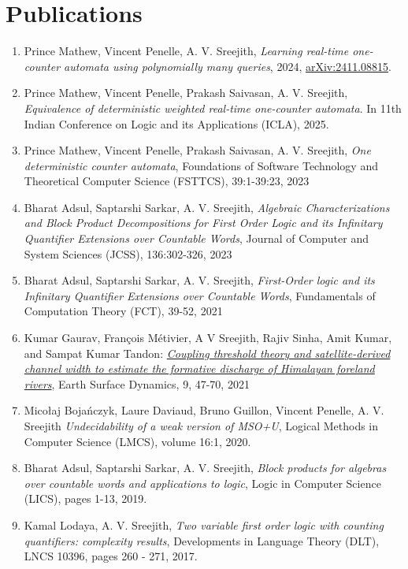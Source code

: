 \documentclass[11pt,a4paper,sans]{moderncv} %
\begin{document}
\section{Publications}
\begin{enumerate}
\item Prince Mathew, Vincent Penelle, A. V. Sreejith, \emph{Learning real-time one-counter automata using polynomially many queries}, 2024, \href{https://arxiv.org/abs/2411.08815}{arXiv:2411.08815}.
\item Prince Mathew, Vincent Penelle, Prakash Saivasan, A. V. Sreejith, \emph{Equivalence of deterministic weighted real-time one-counter automata}. In 11th Indian Conference on Logic and its Applications (ICLA), 2025.
\item Prince Mathew, Vincent Penelle, Prakash Saivasan, A. V. Sreejith, \emph{One deterministic counter automata}, Foundations of Software Technology and Theoretical Computer Science (FSTTCS), 39:1-39:23, 2023
\item Bharat Adsul, Saptarshi Sarkar, A. V. Sreejith, \emph{Algebraic Characterizations and Block Product Decompositions for First Order Logic and its Infinitary Quantifier Extensions over Countable Words}, Journal of Computer and System Sciences (JCSS), 136:302-326, 2023
\item Bharat Adsul, Saptarshi Sarkar, A. V. Sreejith, \emph{First-Order logic and its Infinitary Quantifier Extensions over Countable Words}, Fundamentals of Computation Theory (FCT), 39-52, 2021
\item Kumar Gaurav, Fran\c{c}ois M\'etivier, A V Sreejith, Rajiv Sinha, Amit Kumar, and Sampat Kumar Tandon: \href{https://doi.org/10.5194/esurf-9-47-2021}{\emph{Coupling threshold theory and satellite-derived channel width to estimate the formative discharge of Himalayan foreland rivers}}, Earth Surface Dynamics, 9, 47-70, 2021
\item Mico\l{}aj Boja\'nczyk, Laure Daviaud, Bruno Guillon, Vincent Penelle, A. V. Sreejith \emph{Undecidability of a weak version of MSO+U}, Logical Methods in Computer Science (LMCS), volume 16:1, 2020.
\item Bharat Adsul, Saptarshi Sarkar, A. V. Sreejith, \emph{Block products for algebras over countable words and applications to logic}, Logic in Computer Science (LICS), pages 1-13, 2019.
\item Kamal Lodaya, A. V. Sreejith, \emph{Two variable first order logic with counting quantifiers: complexity results}, Developments in Language Theory (DLT), LNCS 10396, pages 260 - 271, 2017.

\end{enumerate}
\end{document}
